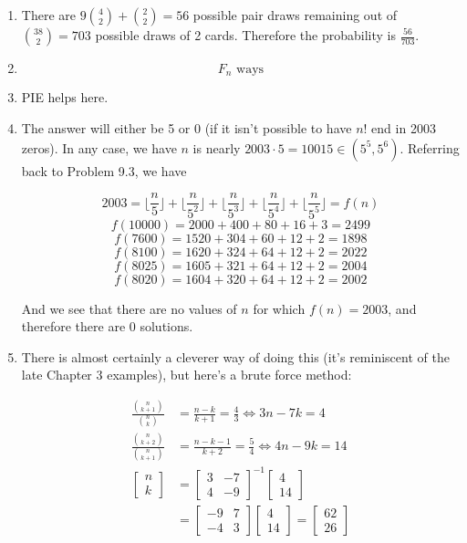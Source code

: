 \documentclass{book}
\numberwithin{equation}{section}
\begin{document}
\begin{enumerate}[label={9.\arabic*}]
\item
There are $9{4 \choose 2} + {2 \choose 2} = 56$ possible pair draws remaining out of ${38 \choose 2} = 703$ possible
draws of 2 cards. Therefore the probability is $\frac{56}{703}$.

\item
$$F_n \text{ ways}$$

\item
PIE helps here.

\item
The answer will either be 5 or 0 (if it isn't possible to have $n!$ end in 2003 zeros). In any case, we have $n$ is nearly
$2003 \cdot 5 = 10015 \in (5^5, 5^6)$. Referring back to Problem 9.3, we have

$$2003 = \lfloor \frac{n}{5} \rfloor + \lfloor \frac{n}{5^2} \rfloor + \lfloor \frac{n}{5^3} \rfloor + \lfloor \frac{n}{5^4} \rfloor + \lfloor \frac{n}{5^5} \rfloor = f(n)$$
$$f(10000) = 2000 + 400 + 80 + 16 + 3 = 2499$$
$$f(7600) = 1520 + 304 + 60 + 12 + 2 = 1898$$
$$f(8100) = 1620 + 324 + 64 + 12 + 2 = 2022$$
$$f(8025) = 1605 + 321 + 64 + 12 + 2 = 2004$$
$$f(8020) = 1604 + 320 + 64 + 12 + 2 = 2002$$

And we see that there are no values of $n$ for which $f(n) = 2003$, and therefore there are 0 solutions.

\item
There is almost certainly a cleverer way of doing this (it's reminiscent of the late Chapter 3 examples), but
here's a brute force method:

\begin{align*}
\frac{{n \choose k+1}}{{n \choose k}} & = \frac{n-k}{k+1} = \frac{4}{3} \iff 3n-7k=4 \\
\frac{{n \choose k+2}}{{n \choose k+1}} & = \frac{n-k-1}{k+2} = \frac{5}{4} \iff 4n-9k=14 \\
\begin{bmatrix} n \\ k \end{bmatrix} & = \begin{bmatrix} 3 & -7 \\ 4 & -9 \end{bmatrix}^{-1} \begin{bmatrix} 4 \\ 14 \end{bmatrix} \\
& =  \begin{bmatrix} -9 & 7 \\ -4 & 3 \end{bmatrix} \begin{bmatrix} 4 \\ 14 \end{bmatrix} = \begin{bmatrix} 62 \\ 26 \end{bmatrix}
\end{align*}


\end{enumerate}
\end{document}
